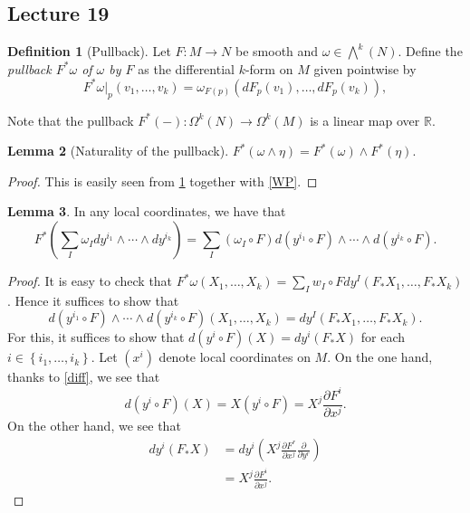 \documentclass[10pt,letterpaper,cm]{nupset}
\theoremstyle{definition}
\newtheorem{definition}{Definition}[subsection]
\theoremstyle{theorem}
\newtheorem{lemma}[definition]{Lemma}
\theoremstyle{remark}
\newcommand{\R}{\mathbb R}
\newcommand{\1}{\mathbf{1}}
\newcommand{\0}{\vec 0}
\begin{document}
\subsection{Lecture 19}


\begin{definition}[Pullback]\label{PB}
Let $F: M \to N$ be smooth and $\omega \in \bigwedge^k(N)$. Define the \textit{pullback $F^{\ast}\omega$ of $\omega$ by $F$} as the differential $k$-form on $M$ given pointwise by $$F^{\ast} \omega\bigr\rvert_p(v_1, \ldots, v_k) = \omega_{F(p)}\left(dF_p(v_1), \ldots, dF_p(v_k)\right),$$
\end{definition}


Note that the pullback $F^{\ast}(-) : \Omega^k(N) \to \Omega^k(M)$ is a linear map over $\R$. 


\begin{lemma}[Naturality of the pullback]
$F^{\ast}\left(\omega \wedge \eta\right) = F^{\ast}\left(\omega\right) \wedge F^{\ast}\left(\eta\right).$
\end{lemma}
\begin{proof}
This is easily seen from \cref{PB} together with \cref{WP}.
\end{proof}

\begin{lemma}\label{natpull}
In any local coordinates, we have that $$F^{\ast}\left(\sum_I \omega_I dy^{i_1} \wedge \cdots \wedge dy^{i_k}\right) = \sum_I \left(\omega_I \circ F\right)d\left(y^{i_1} \circ F\right) \wedge \cdots \wedge d\left(y^{i_k} \circ F\right).$$
\end{lemma}
\begin{proof}
It is easy to check that $F^{\ast}{\omega}\left(X_1, \ldots, X_k\right) = \sum_Iw_I\circ Fdy^I\left(F_{\ast}{X_1}, \ldots, F_{\ast}{X_k}\right)$. Hence it suffices to show that 
\[
d\left(y^{i_1} \circ F\right) \wedge \cdots \wedge d\left(y^{i_k} \circ F\right)\left(X_1, \ldots, X_k\right) = dy^I\left(F_{\ast}{X_1}, \ldots, F_{\ast}{X_k}\right).
\] For this, it suffices to show that $d\left(y^i \circ F\right)(X) = dy^i\left(F_{\ast}{X}\right)$ for each $i \in \left\{ i_1, \ldots, i_k\right\}$. Let $\left(x^i\right)$ denote local coordinates on $M$. On the one hand, thanks to \cref{diff}, we see that
\[
d\left(y^i \circ F\right)(X)  = X\left(y^i \circ F\right)
= X^j\frac{\partial{F^i}}{\partial{x^j}}
. \]
On the other hand, we see that
\begin{align*}
dy^i\left(F_{\ast}{X}\right) & = dy^i\left(X^j\frac{\partial{F^r}}{\partial{x^j}}\frac{\partial}{\partial{y^r}}    \right)
\\ & = X^j\frac{\partial{F^i}}{\partial{x^j}}
.\end{align*}
\end{proof}
\end{document}

